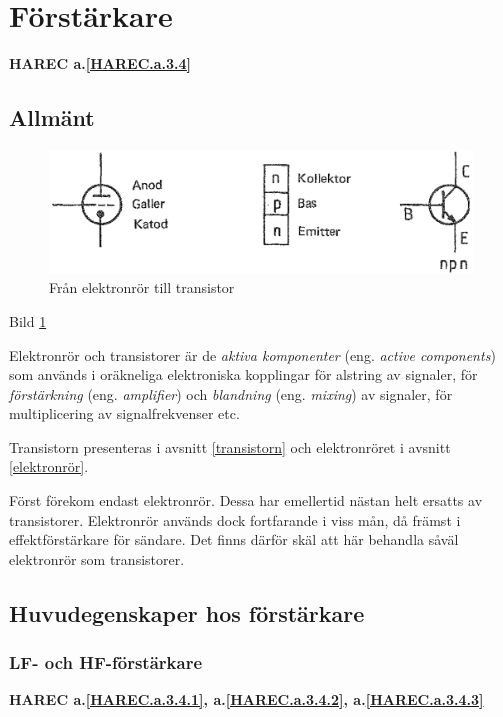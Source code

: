 \section{Förstärkare}
\textbf{HAREC a.\ref{HAREC.a.3.4}\label{myHAREC.a.3.4}}

\subsection{Allmänt}

\begin{figure}
\includegraphics[width=\textwidth]{images/cropped_pdfs/bild_2_3-40.pdf}
\caption{Från elektronrör till transistor}
\label{fig:BildII3-40}
\end{figure}

Bild \ref{fig:BildII3-40}

Elektronrör och transistorer är de \emph{aktiva komponenter} (eng.
\emph{active components}) som används i oräkneliga elektroniska kopplingar för
alstring av signaler, för \emph{förstärkning} (eng. \emph{amplifier}) och
\emph{blandning} (eng. \emph{mixing}) av signaler, för multiplicering av
signalfrekvenser etc.

Transistorn presenteras i avsnitt \ref{transistorn} och elektronröret i avsnitt \ref{elektronrör}.

Först förekom endast elektronrör. Dessa har emellertid nästan helt
ersatts av transistorer.
Elektronrör används dock fortfarande i viss mån, då främst i
effektförstärkare för sändare.
Det finns därför skäl att här behandla såväl elektronrör som transistorer.

\subsection{Huvudegenskaper hos förstärkare}
\subsubsection{LF- och HF-förstärkare}
\textbf{HAREC a.\ref{HAREC.a.3.4.1}, a.\ref{HAREC.a.3.4.2}, a.\ref{HAREC.a.3.4.3}\label{myHAREC.a.3.4.1}\label{myHAREC.a.3.4.2}\label{myHAREC.a.3.4.3}}

